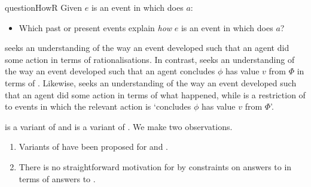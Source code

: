 \begin{note}
  \begin{question}{questionHowR}{\qHowR{}}
    Given \(e\) is an event in which \vAgent{} does \(a\):

    \begin{itemize}
    \item
      Which past or present events explain \emph{how} \(e\) is an event in which \vAgent{} does \(a\)?
    \end{itemize}
    \vspace{-1.5\baselineskip}
  \end{question}

  \noindent%
  \qWhyR{} seeks an understanding of the way an event developed such that an agent did some action in terms of rationalisations.
  In contrast, \qWhy{} seeks an understanding of the way an event developed such that an agent concludes \(\phi\) has value \(v\) from \(\Phi\) in terms of \ros{}.
  Likewise, \qHowR{} seeks an understanding of the way an event developed such that an agent did some action in terms of what happened, while \qHow{} is a restriction of \qHowR{} to events in which the relevant action is `concludes \(\phi\) has value \(v\) from \(\Phi\)'.
\end{note}

\begin{note}
  \qWhyR{} is a variant of \qWhy{} and \qHowR{} is a variant of \qHow{}.
  We make two observations.

  \begin{enumerate}
  \item
    Variants of \issueInclusion{} have been proposed for \qWhyR{} and \qHow{}.
  \item
    There is no straightforward motivation for \issueInclusion{} by constraints on answers to \qWhyR{} in terms of answers to \qHow{}.
  \end{enumerate}
\end{note}

